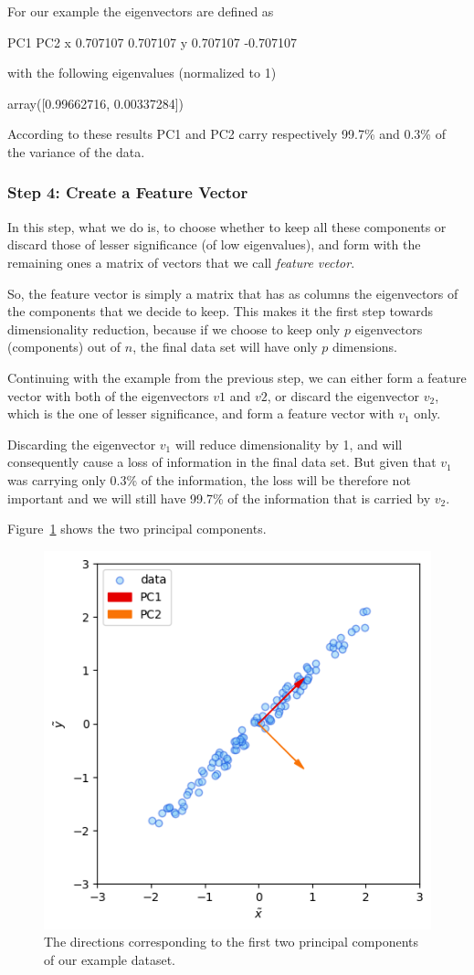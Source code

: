 \begin{enumerate}
For our example the eigenvectors are defined as
\begin{ioutput}
        PC1       PC2
x  0.707107  0.707107
y  0.707107 -0.707107
\end{ioutput}
with the following eigenvalues (normalized to 1)
\begin{ioutput}
array([0.99662716, 0.00337284])
\end{ioutput}

According to these results PC1 and PC2 carry respectively 99.7\% and 0.3\% of the variance of the data.

\subsubsection*{Step 4: Create a Feature Vector}

In this step, what we do is, to choose whether to keep all these components or discard those of lesser significance (of low eigenvalues), and form with the remaining ones a matrix of vectors that we call \emph{feature vector}.

So, the feature vector is simply a matrix that has as columns the eigenvectors of the components that we decide to keep. This makes it the first step towards dimensionality reduction, because if we choose to keep only $p$ eigenvectors (components) out of $n$, the final data set will have only $p$ dimensions.

Continuing with the example from the previous step, we can either form a feature vector with both of the eigenvectors $v1$ and $v2$, or discard the eigenvector $v_2$, which is the one of lesser significance, and form a feature vector with $v_1$ only.

Discarding the eigenvector $v_1$ will reduce dimensionality by 1, and will consequently cause a loss of information in the final data set. But given that $v_1$ was carrying only 0.3\% of the information, the loss will be therefore not important and we will still have 99.7\% of the information that is carried by $v_2$.

Figure~\ref{fig:pca_result} shows the two principal components.

\begin{figure}[hbt]
\centering
\includegraphics[width=0.5\linewidth]{figures/pca_components}
\caption{The directions corresponding to the first two principal components of our example dataset.}
\label{fig:pca_result}
\end{figure}


\end{enumerate}
